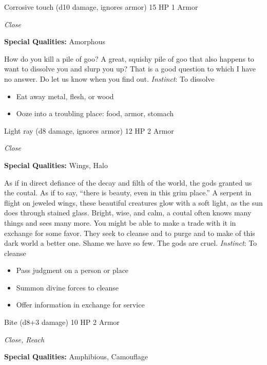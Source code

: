 \HRule
{}

Corrosive touch (d10 damage, ignores armor)\hspace*{\fill} 15 HP 1 Armor

\emph{Close}

\textbf{Special Qualities:}
Amorphous

\HRule
How do you kill a pile of goo? A great, squishy pile of goo that also happens to want to dissolve you and slurp you up? That is a good question to which I have no answer. Do let us know when you find out. \emph{Instinct}: To dissolve
\begin{itemize}
\item Eat away metal, flesh, or wood
\item Ooze into a troubling place: food, armor, stomach
\end{itemize}

\HRule
{}

Light ray (d8 damage, ignores armor)\hspace*{\fill} 12 HP 2 Armor

\emph{Close}

\textbf{Special Qualities:}
Wings, Halo

\HRule
As if in direct defiance of the decay and filth of the world, the gods granted us the coutal. As if to say, ``there is beauty, even in this grim place.'' A serpent in flight on jeweled wings, these beautiful creatures glow with a soft light, as the sun does through stained glass. Bright, wise, and calm, a coutal often knows many things and sees many more. You might be able to make a trade with it in exchange for some favor. They seek to cleanse and to purge and to make of this dark world a better one. Shame we have so few. The gods are cruel. \emph{Instinct}: To cleanse
\begin{itemize}
\item Pass judgment on a person or place
\item Summon divine forces to cleanse
\item Offer information in exchange for service
\end{itemize}
\newpage
\HRule
{}

Bite (d8+3 damage)\hspace*{\fill} 10 HP 2 Armor

\emph{Close, Reach}

\textbf{Special Qualities:}
Amphibious, Camouflage

